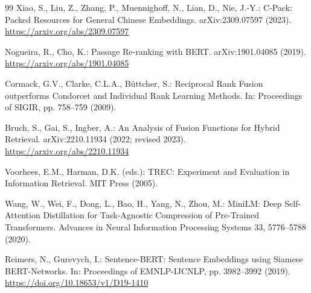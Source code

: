 \begin{thebibliography}{99}
Xiao, S., Liu, Z., Zhang, P., Muennighoff, N., Lian, D., Nie, J.-Y.: C-Pack: Packed Resources for General Chinese Embeddings. arXiv:2309.07597 (2023).
\url{https://arxiv.org/abs/2309.07597}

Nogueira, R., Cho, K.: Passage Re-ranking with BERT. arXiv:1901.04085 (2019).
\url{https://arxiv.org/abs/1901.04085}

Cormack, G.V., Clarke, C.L.A., B\"uttcher, S.: Reciprocal Rank Fusion outperforms Condorcet and Individual Rank Learning Methods. In: Proceedings of SIGIR, pp. 758--759 (2009).

Bruch, S., Gai, S., Ingber, A.: An Analysis of Fusion Functions for Hybrid Retrieval. arXiv:2210.11934 (2022; revised 2023).
\url{https://arxiv.org/abs/2210.11934}

Voorhees, E.M., Harman, D.K. (eds.): TREC: Experiment and Evaluation in Information Retrieval. MIT Press (2005).

Wang, W., Wei, F., Dong, L., Bao, H., Yang, N., Zhou, M.: MiniLM: Deep Self-Attention Distillation for Task-Agnostic Compression of Pre-Trained Transformers. Advances in Neural Information Processing Systems 33, 5776--5788 (2020).

Reimers, N., Gurevych, I.: Sentence-BERT: Sentence Embeddings using Siamese BERT-Networks. In: Proceedings of EMNLP-IJCNLP, pp. 3982--3992 (2019).
\url{https://doi.org/10.18653/v1/D19-1410}
\end{thebibliography}
